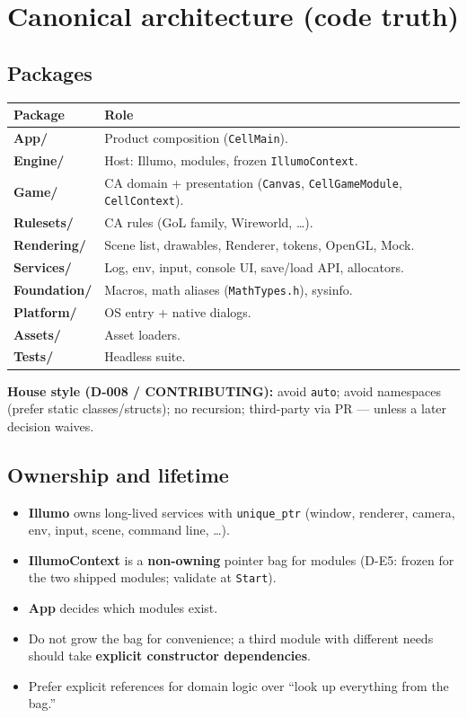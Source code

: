\documentclass[10pt,a4paper]{article}
\begin{document}
\section{Canonical architecture (code truth)}

\subsection{Packages}
\begin{table}[h!]
\centering
\small
\begin{tabularx}{\textwidth}{l X}
\toprule
\textbf{Package} & \textbf{Role} \\
\midrule
\textbf{App/} & Product composition (\texttt{CellMain}). \\
\textbf{Engine/} & Host: Illumo, modules, frozen \texttt{IllumoContext}. \\
\textbf{Game/} & CA domain + presentation (\texttt{Canvas}, \texttt{CellGameModule}, \texttt{CellContext}). \\
\textbf{Rulesets/} & CA rules (GoL family, Wireworld, \dots). \\
\textbf{Rendering/} & Scene list, drawables, Renderer, tokens, OpenGL, Mock. \\
\textbf{Services/} & Log, env, input, console UI, save/load API, allocators. \\
\textbf{Foundation/} & Macros, math aliases (\texttt{MathTypes.h}), sysinfo. \\
\textbf{Platform/} & OS entry + native dialogs. \\
\textbf{Assets/} & Asset loaders. \\
\textbf{Tests/} & Headless suite. \\
\bottomrule
\end{tabularx}
\end{table}

\noindent \textbf{House style (D-008 / CONTRIBUTING):} avoid \texttt{auto}; avoid namespaces (prefer static classes/structs); no recursion; third-party via PR --- unless a later decision waives.

\subsection{Ownership and lifetime}
\begin{itemize}
    \item \textbf{Illumo} owns long-lived services with \texttt{unique\_ptr} (window, renderer, camera, env, input, scene, command line, \dots).
    \item \textbf{IllumoContext} is a \textbf{non-owning} pointer bag for modules (D-E5: frozen for the two shipped modules; validate at \texttt{Start}).
    \item \textbf{App} decides which modules exist.
    \item Do not grow the bag for convenience; a third module with different needs should take \textbf{explicit constructor dependencies}.
    \item Prefer explicit references for domain logic over ``look up everything from the bag.''
\end{itemize}
\end{document}
